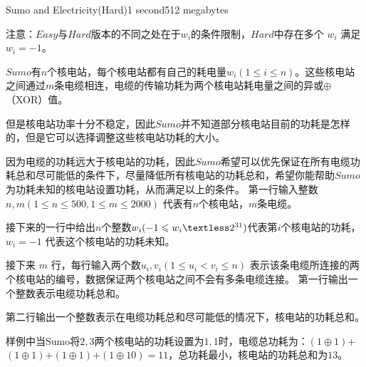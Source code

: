 \documentclass[11pt,a4paper,oneside]{article}
\begin{document}
\begin{problem}{Sumo and Electricity(Hard)}{}{}{1 second}{512 megabytes}
	
	{	
		注意：$Easy$与$Hard$版本的不同之处在于$w_i$的条件限制，$Hard$中存在多个 $w_i$ 满足 $w_i = -1$。
	}
	
	$Sumo$有$n$个核电站，每个核电站都有自己的耗电量$w_i(1\leq i\leq n)$。这些核电站之间通过$m$条电缆相连，电缆的传输功耗为两个核电站耗电量之间的异或$\oplus$（XOR）值。
	
	但是核电站功率十分不稳定，因此$Sumo$并不知道部分核电站目前的功耗是怎样的，但是它可以选择调整这些核电站功耗的大小。
	
	因为电缆的功耗远大于核电站的功耗，因此$Sumo$希望可以优先保证在所有电缆功耗总和尽可能低的条件下，尽量降低所有核电站的功耗总和，希望你能帮助$Sumo$为功耗未知的核电站设置功耗，从而满足以上的条件。
	\InputFile
	第一行输入整数 $n,m(1\leq n \leq 500,1\leq m \leq 2000)$ 代表有$n$个核电站，$m$条电缆。
	
	接下来的一行中给出$n$个整数$w_i( -1 \leq w_i \textless 2^{31})$代表第$i$个核电站的功耗，$w_i = -1$ 代表这个核电站的功耗未知。
	
	接下来 $m$ 行，每行输入两个数$u_i,v_i(1 \leq u_i<v_i \leq n)$ 表示该条电缆所连接的两个核电站的编号，数据保证两个核电站之间不会有多条电缆连接。
	\OutputFile
	第一行输出一个整数表示电缆功耗总和。
	
	第二行输出一个整数表示在电缆功耗总和尽可能低的情况下，核电站的功耗总和。
	\Examples
	\begin{example}
	\end{example}
	\Explanation
	样例中当Sumo将$2,3$两个核电站的功耗设置为$1,1$时，电缆总功耗为：$(1\oplus 1)$$+$$(1\oplus 1)$$+$$(1 \oplus 1)$$+$$(1 \oplus 10)$$=$$11$，总功耗最小，核电站的功耗总和为$13$。
\end{problem}
\end{document}
